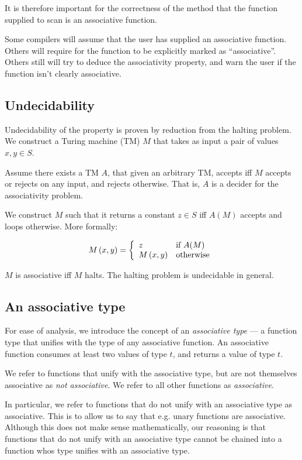 It is therefore important for the correctness of the method that the function
supplied to scan is an associative function.

Some compilers will assume that the user has supplied an associative function.
Others will require for the function to be explicitly marked as
``associative''. Others still will try to deduce the associativity property,
and warn the user if the function isn't clearly associative.

\subsection{Undecidability}

Undecidability of the property is proven by reduction from the halting
problem. We construct a Turing machine (TM) $M$ that takes as input a pair of values $x,y\in S$.

Assume there exists a TM $A$, that given an arbitrary TM, accepts iff $M$
accepts or rejects on any input, and rejects otherwise. That is, $A$ is a
decider for the associativity problem.

We construct $M$ such that it returns a constant $z\in S$ iff $A(M)$ accepts
and loops otherwise. More formally:

\[M\left({x,y}\right) = \left\{ \begin{array}{l l} z & \text{if $A(M)$} \\ M\left({x,y}\right) &
\text{otherwise} \end{array} \right.\]

$M$ is associative iff $M$ halts. The halting problem is undecidable in
general.

\subsection{An associative type}

For ease of analysis, we introduce the concept of an \emph{associative type}
--- a function type that unifies with the type of any associative function. An
associative function consumes at least two values of type $t$, and returns a
value of type $t$.

We refer to functions that unify with the associative type, but are not
themselves associative as \emph{not associative}. We refer to all other
functions as \emph{associative}.

In particular, we refer to functions that do not unify with an associative type
as associative. This is to allow us to say that e.g. unary functions are
associative. Although this does not make sense mathematically, our reasoning is
that functions that do not unify with an associative type cannot be chained
into a function whos type unifies with an associative type.

